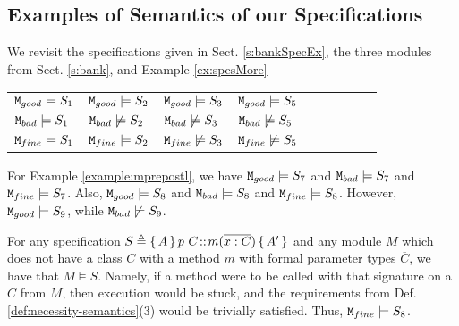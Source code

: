 \subsection{Examples of Semantics of our Specifications}

\begin{example}
 \label{example:twostatesarisfy}
We  revisit the specifications given in Sect. \ref{s:bankSpecEx},  the three  modules from Sect. \ref{s:bank}, and Example \ref{ex:spesMore}


\begin{tabular}{lllllllll}
$\ModA  \models S_1$  &   $\ModA  \models S_2$ &   $\ModA \models S_3$    & $\ModA \models S_5$\\
 $\ModB \models S_1$  &   $\ModB \not\models S_2$   &  $\ModB  \not\models S_3$   & $\ModB \not\models S_5$ \\
 $\ModC  \models S_1$    & $\ModC \models S_2$ & $\ModC \not\models S_3$   & $\ModC \not\models S_5$ 
\end{tabular}
\end{example}
 

 
 \begin{example}
 \label{example:mprepostlsatissy}
 For  %
 Example \ref{example:mprepostl}, we have
  $\ModA \models S_7$ and $\ModB \models S_7$ and  $\ModC \models S_7$.
Also,  $\ModA \models S_8$ and $\ModB \models S_8$ and  $\ModC \models S_8$.
However,   $\ModA  \models S_9$, while $\ModB  \not\models S_9$.
\end{example}

 \begin{example}
\label{example:mprepostlsatissy}
 For  %
any   specification  $S \triangleq {\mprepost{A}{p\ C}{m}{x}{C}{A'} }$ and any module  $M$ which does not have a class $C$  with a method $m$ with formal parameter  types ${\overline C}$, we have that $M \models S$.
Namely, if a method were to be called with that signature on a $C$  from $M$, then execution would be stuck, and the requirements from Def. \ref{def:necessity-semantics}(3) would be trivially satisfied.
Thus,   $\ModC \models S_8$. %
\end{example}


 
